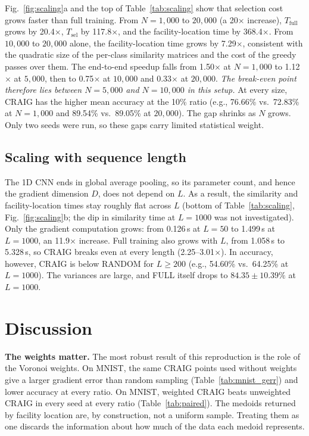 \documentclass[conference]{IEEEtran}
\newcommand{\Tsel}{T_{\mathrm{sel}}}
\newcommand{\Tfull}{T_{\mathrm{full}}}
\begin{document}
Fig.~\ref{fig:scaling}a and the top of Table~\ref{tab:scaling} show that selection cost grows faster than full training. From $N{=}1{,}000$ to $20{,}000$ (a 20$\times$ increase), $\Tfull$ grows by 20.4$\times$, $\Tsel$ by 117.8$\times$, and the facility-location time by 368.4$\times$. From $10{,}000$ to $20{,}000$ alone, the facility-location time grows by 7.29$\times$, consistent with the quadratic size of the per-class similarity matrices and the cost of the greedy passes over them. The end-to-end speedup falls from 1.50$\times$ at $N{=}1{,}000$ to 1.12$\times$ at $5{,}000$, then to 0.75$\times$ at $10{,}000$ and 0.33$\times$ at $20{,}000$. \emph{The break-even point therefore lies between $N{=}5{,}000$ and $N{=}10{,}000$ in this setup.} At every size, CRAIG has the higher mean accuracy at the 10\% ratio (e.g., 76.66\% vs.\ 72.83\% at $N{=}1{,}000$ and 89.54\% vs.\ 89.05\% at $20{,}000$). The gap shrinks as $N$ grows. Only two seeds were run, so these gaps carry limited statistical weight.

\subsection{Scaling with sequence length}

The 1D CNN ends in global average pooling, so its parameter count, and hence the gradient dimension $D$, does not depend on $L$. As a result, the similarity and facility-location times stay roughly flat across $L$ (bottom of Table~\ref{tab:scaling}, Fig.~\ref{fig:scaling}b; the dip in similarity time at $L{=}1000$ was not investigated). Only the gradient computation grows: from 0.126\,s at $L{=}50$ to 1.499\,s at $L{=}1000$, an 11.9$\times$ increase. Full training also grows with $L$, from 1.058\,s to 5.328\,s, so CRAIG breaks even at every length (2.25--3.01$\times$). In accuracy, however, CRAIG is below RANDOM for $L\ge200$ (e.g., 54.60\% vs.\ 64.25\% at $L{=}1000$). The variances are large, and FULL itself drops to $84.35\pm10.39\%$ at $L{=}1000$.

\section{Discussion}
\label{sec:discussion}
\textbf{The weights matter.} The most robust result of this reproduction is the role of the Voronoi weights. On MNIST, the same CRAIG points used without weights give a larger gradient error than random sampling (Table~\ref{tab:mnist_gerr}) and lower accuracy at every ratio. On MNIST, weighted CRAIG beats unweighted CRAIG in every seed at every ratio (Table~\ref{tab:paired}). The medoids returned by facility location are, by construction, not a uniform sample. Treating them as one discards the information about how much of the data each medoid represents.
\end{document}
